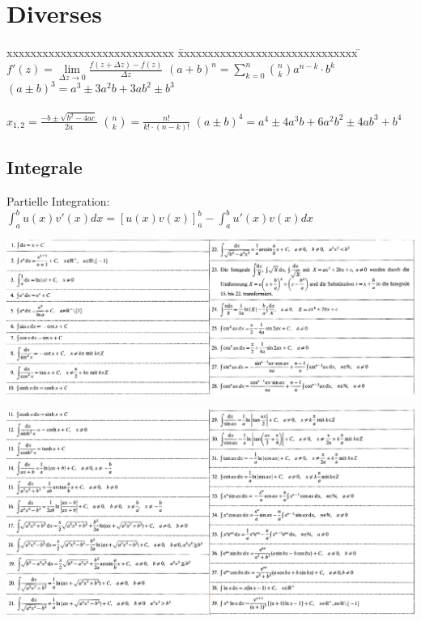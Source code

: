 \section{Diverses}
\begin{tabbing}
	xxxxxxxxxxxxxxxxxxxxxxxxxxxx \= xxxxxxxxxxxxxxxxxxxxxxxxxxxxxx \= \kill
 	$f'(z) = \lim \limits_{\Delta z \rightarrow 0} \frac{f(z + \Delta z) -
	f(z)}{\Delta z}$ \> $(a + b)^n = \sum_{k=0}^{n} \binom n k a^{n-k} \cdot b^k$ \>
	$(a \pm b)^3 =a^3 \pm  3 a^{2} b + 3 a b^2 \pm b^3 $\\ \\
	$x_{1,2} = \frac{-b \pm \sqrt{b^2 - 4ac}}{2a}$ \> $\binom n k = \frac{n!}{k!
	\cdot (n-k)!}$ \> $(a \pm b)^4 =a^4 \pm  4 a^{3} b + 6a^2b^2 \pm 4 a b^3 +
	b^4$\\ 
\end{tabbing}

\subsection{Integrale}
	Partielle Integration: $\int^{b}_{a} u(x) v'(x) dx = [u(x)v(x)]^{b}_{a} - \int^{b}_{a} u'(x) v(x) dx$
	\begin{center}
	\includegraphics[width=18cm]{./bilder/integral1.png}
	\end{center}
	\newpage
	\begin{center}
	\includegraphics[width=18cm]{./bilder/integral2.png}
	\end{center}


